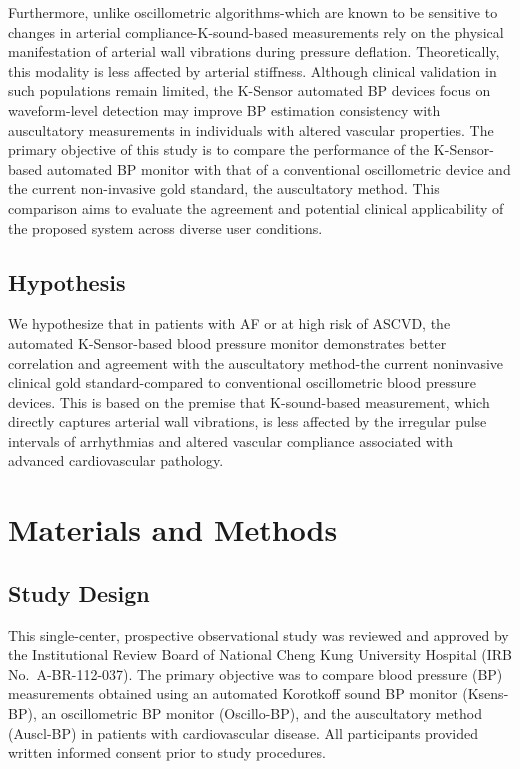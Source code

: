 \documentclass[
  12pt,
  letterpaper,
  openany,
  oneside]{book}
\begin{document}
Furthermore, unlike oscillometric algorithms-which are known to be
sensitive to changes in arterial compliance-K-sound-based measurements
rely on the physical manifestation of arterial wall vibrations during
pressure deflation. Theoretically, this modality is less affected by
arterial stiffness. Although clinical validation in such populations
remain limited, the K-Sensor automated BP devices focus on
waveform-level detection may improve BP estimation consistency with
auscultatory measurements in individuals with altered vascular
properties. The primary objective of this study is to compare the
performance of the K-Sensor-based automated BP monitor with that of a
conventional oscillometric device and the current non-invasive gold
standard, the auscultatory method. This comparison aims to evaluate the
agreement and potential clinical applicability of the proposed system
across diverse user conditions.

\section{Hypothesis}\label{hypothesis}

We hypothesize that in patients with AF or at high risk of ASCVD, the
automated K-Sensor-based blood pressure monitor demonstrates better
correlation and agreement with the auscultatory method-the current
noninvasive clinical gold standard-compared to conventional
oscillometric blood pressure devices. This is based on the premise that
K-sound-based measurement, which directly captures arterial wall
vibrations, is less affected by the irregular pulse intervals of
arrhythmias and altered vascular compliance associated with advanced
cardiovascular pathology.


\chapter{Materials and Methods}\label{materials-and-methods}

\section{Study Design}\label{study-design}

This single-center, prospective observational study was reviewed and
approved by the Institutional Review Board of National Cheng Kung
University Hospital (IRB No.~A-BR-112-037). The primary objective was to
compare blood pressure (BP) measurements obtained using an automated
Korotkoff sound BP monitor (Ksens-BP), an oscillometric BP monitor
(Oscillo-BP), and the auscultatory method (Auscl-BP) in patients with
cardiovascular disease. All participants provided written informed
consent prior to study procedures.
\end{document}
